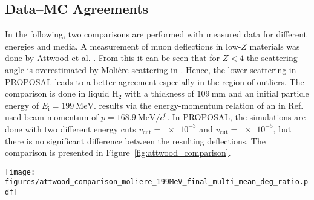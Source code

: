 \subsection{Data--MC Agreements}
In the following, two comparisons are performed with measured data for 
different energies and media.
A measurement of muon deflections in low-$Z$ materials was done by Attwood et al. \cite{attwood_2006}. 
From this it can be seen that for $Z < 4$ the scattering angle is overestimated 
by Molière scattering in . Hence, the lower scattering in PROPOSAL leads 
to a better agreement especially in the region of outliers. The comparison is 
done in liquid $\text{H}_2$ with a thickness of $\SI{109}{\milli\meter}$ and an 
initial particle energy of $E_{\mathrm{i}} = \SI{199}{\mega\electronvolt}$. 
results via the energy-momentum relation of an in Ref.~\cite{attwood_2006} used 
beam momentum 
of $p = \SI[per-mode=symbol]{168.9}{\mega\electronvolt\per\clight}$. 
In PROPOSAL, the simulations are done with two different energy cuts $v_{\mathrm{cut}} = \num{e-3}$ and $v_{\mathrm{cut}} = \num{e-5}$, 
but there is no significant difference between the resulting deflections.
The comparison is presented in Figure~\ref{fig:attwood_comparison}.

\begin{figure*}
    \centering 
    \texttt{[image: figures/attwood\_comparison\_moliere\_199MeV\_final\_multi\_mean\_deg\_ratio.pdf]}
    \caption{
    Muons are 
    propagated with $E_{\mathrm{i}} = \SI{199}{\mega\electronvolt}$ through 
    $\SI{109}{\milli\meter}$ of liquid $\text{H}_2$.
    Measured data of Attwood et al. and simulation data of  are taken from Ref.~\cite{attwood_2006}.    
    The figure presents 
    the normalized counts in dependence of the projected scattering angle $\theta_{\mathrm{y}}$ in degree.
    In PROPOSAL, $100$ simulations each with $\num{e5}$ muons are performed for two different settings using the energy cut 
    $v_{\mathrm{cut}} = \num{e-5}$. The blue points present the mean considering
    stochastic deflections and Molière scattering , the orange 
    points
    present the mean taking into account only Molière scattering.   
    The uncertainties on the $x$--axis result due to the measured bin widths. The $y$--uncertainties are the standard deviations.   
    The deflections are  
    underestimated in PROPOSAL, except at $\theta_{\mathrm{y}} \approx 
    \SI{0}{\degree}$ . At deflections $\SI{2}{\degree} < \theta_{\mathrm{y}} < \SI{5}{\degree}$, 
    the result seems to be more accurate than 's. The consideration of the stochastic deflections shows no significant influence.}
    \label{fig:attwood_comparison}
\end{figure*}

